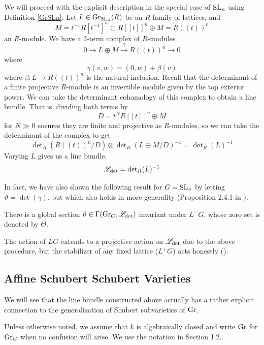 \documentclass[12pt]{article}
\begin{document}
We will proceed with the explicit description in the special case of $\operatorname{SL}_n$ using Definition \ref{GrSLn}. Let $L \in \operatorname{Gr}_{\operatorname{SL}_n}(R)$ be an $R$-family of lattices, and 
\[M = t^{-1} R[t^{-1}]^n\subset R[[t]]^n \oplus M = R((t))^n\] 
an $R$-module. We have a $2$-term complex of $R$-modules
\begin{equation}
    0 \to L \oplus M \xrightarrow{\gamma} R((t))^n \to 0
\end{equation}
where
\begin{equation*}
    \gamma(v,w) = (0,w) + \beta(v)
\end{equation*}
where $\beta \colon L \to R((t))^n$ is the natural inclusion. Recall that the determinant of a finite projective $R$-module is an invertible module given by the top exterior power. We can take the determinant cohomology of this complex to obtain a line bundle. That is, dividing both terms by 
\[D = t^N R[[t]]^n \oplus M\]
for $N \gg 0$ ensures they are finite and projective as $R$-modules, so we can take the determinant of the complex to get
\[\det\nolimits_R (R((t))^n/D) \otimes \det\nolimits_R (L \oplus M/D)^{-1} = \det\nolimits_R(L)^{-1}\]
Varying $L$ gives us a line bundle.
\begin{equation}
    \mathscr{L}_{\det} = \det\nolimits_R(L)^{-1}
\end{equation}

In fact, we have also shown the following result for $G = \operatorname{SL}_n$ by letting $\vartheta = \det(\gamma)$, but which also holds in more generality (Proposition 2.4.1 in \cite{Zhu2016}).

\begin{prop}
    There is a global section $\vartheta \in \Gamma(\operatorname{Gr}_G, \mathscr{L}_{\det})$ invariant under $L^-G$, whose zero set is denoted by $\Theta$.
\end{prop}

The action of $LG$ extends to a projective action on $\mathscr{L}_{\det}$ due to the above procedure, but the stabilizer of any fixed lattice ($L^+G$) acts honestly (\cite{Faltings2003}).

\subsection{Affine Schubert Schubert Varieties}
We will see that the line bundle constructed above actually has a rather explicit connection to the generalization of Shubert subvarieties of $\operatorname{Gr}$.

Unless otherwise noted, we assume that $k$ is algebraically closed and write $\operatorname{Gr}$ for $\operatorname{Gr}_G$ when no confusion will arise. We use the notation in Section 1.2.
\end{document}
